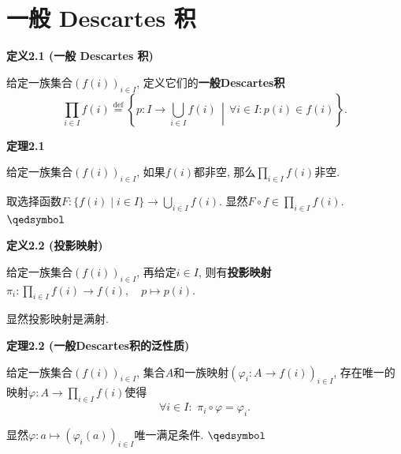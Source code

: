 \documentclass[UTF8]{ctexart}
\begin{document}











\vspace{20pt}

\section{一般 Descartes 积}

\hypertarget{sec:定义2.1}{}
\noindent\textbf{定义2.1 (一般 Descartes 积)}

给定一族集合$(f(i))_{i\in I}$, 定义它们的\textbf{一般Descartes积}
\[
    \prod_{i\in I}f(i)\overset{\mathrm{def}}{=}
    \left\{p:I\to\bigcup_{i\in I}f(i)\,\middle\vert\,
    \forall i\in I:p(i)\in f(i)\right\}.
\]

\vspace{10pt}

\hypertarget{sec:定理2.1}{}
\noindent\textbf{定理2.1}

给定一族集合$(f(i))_{i\in I}$, 如果$f(i)$都非空,
那么$\displaystyle\prod_{i\in I}f(i)$非空.


取选择函数$\displaystyle F:\{f(i)\mid i\in I\}\to\bigcup_{i\in I}f(i)$.
显然$\displaystyle F\circ f\in\prod_{i\in I}f(i)$. \hfill $\qedsymbol$

\vspace{10pt}

\hypertarget{sec:定义2.2}{}
\noindent\textbf{定义2.2 (投影映射)}

给定一族集合$(f(i))_{i\in I}$, 再给定$i\in I$, 则有\textbf{投影映射}
$\displaystyle\pi_i:\prod_{i\in I}f(i)\to f(i),\quad p\mapsto p(i)$.

显然投影映射是满射.

\vspace{10pt}

\hypertarget{sec:定理2.2}{}
\noindent\textbf{定理2.2 (一般Descartes积的泛性质)}

给定一族集合$(f(i))_{i\in I}$, 集合$A$和一族映射$(\varphi_i:A\to f(i))_{i\in I}$,
存在唯一的映射$\displaystyle\varphi:A\to\prod_{i\in I}f(i)$使得
\[
    \forall i\in I:\,\,\pi_i\circ\varphi=\varphi_i.
\]


显然$\varphi:a\mapsto(\varphi_i(a))_{i\in I}$唯一满足条件. \hfill $\qedsymbol$

\end{document}
